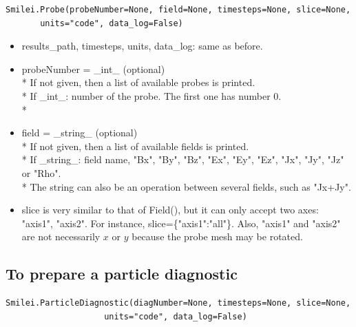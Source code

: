 \documentclass[11pt]{article}
\newcommand{\code}[1]{\colorbox{yellow!15}{\ttfamily #1}}
\begin{document}
\begin{lstlisting}
Smilei.Probe(probeNumber=None, field=None, timesteps=None, slice=None,
       units="code", data_log=False)
\end{lstlisting}

\begin{itemize}
\item \code{results\_path}, \code{timesteps}, \code{units}, \code{data\_log}: same as before.
\item \code{probeNumber} = \code{\_int\_} (optional)\\*
	If not given, then a list of available probes is printed.\\*
	If \code{\_int\_}: number of the probe. The first one has number 0.\\*
\item \code{field} = \code{\_string\_} (optional)\\*
	If not given, then a list of available fields is printed.\\*
	If \code{\_string\_}: field name, \code{"Bx"}, \code{"By"}, \code{"Bz"}, \code{"Ex"}, \code{"Ey"}, \code{"Ez"}, \code{"Jx"}, \code{"Jy"}, \code{"Jz"} or \code{"Rho"}.\\*
	The string can also be an operation between several fields, such as \code{"Jx+Jy"}.
\item \code{slice} is very similar to that of \code{Field()}, but it can only accept two axes: \code{"axis1"}, \code{"axis2"}.
	For instance, \code{slice=\{"axis1":"all"\}}. Also, \code{"axis1"} and \code{"axis2"} are not necessarily $x$ or $y$ because the probe mesh may be rotated.
\end{itemize}
\vspace{0.5cm}


\subsection{To prepare a particle diagnostic}

\begin{lstlisting}
Smilei.ParticleDiagnostic(diagNumber=None, timesteps=None, slice=None,
                    units="code", data_log=False)
\end{lstlisting}
\end{document}
